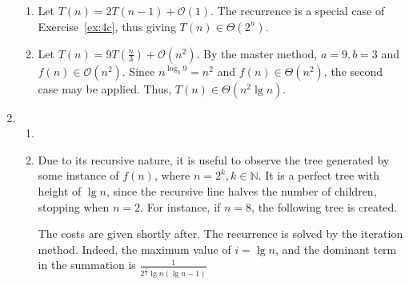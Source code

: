 \documentclass[12pt]{article}
\begin{document}
\begin{enumerate}
\begin{enumerate}
        \item Let $T(n) = 2T(n - 1) + \mathcal{O}(1)$. The recurrence is a special case of Exercise~\ref{ex:4c}, thus giving $T(n) \in \Theta(2^{n})$.
        \item Let $T(n) = 9T(\frac{n}{3}) + \mathcal{O}(n^{2})$. By the master method, $a = 9, b = 3$ and $f(n) \in \mathcal{O}(n^{2})$. Since $n^{\log_{3} 9} = n^{2}$ and $f(n) \in \Theta(n^{2})$, the second case may be applied. Thus, $T(n) \in \Theta(n^{2} \lg n)$.
    \end{enumerate}
    \item
    \begin{enumerate}
        \item 
        \item Due to its recursive nature, it is useful to observe the tree generated by some instance of $f(n)$, where $n = 2^{k}, k \in \mathbb{N}$. It is a perfect tree with height of $\lg n$, since the recursive line halves the number of children, stopping when $n = 2$. For instance, if $n = 8$, the following tree is created.
        \begin{figure}[htbp]
          \centering
        \end{figure}
        The costs are given shortly after. The recurrence is solved by the iteration method. Indeed, the maximum value of $i = \lg n$, and the dominant term in the summation is $\frac{1}{2^{\frac{1}{2}}\lg n(\lg n - 1)}$

\end{enumerate}
\end{enumerate}
\end{document}
